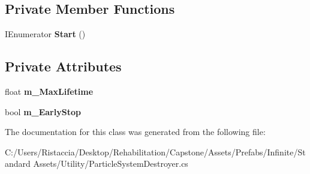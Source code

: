 \subsection*{Private Member Functions}
\begin{DoxyCompactItemize}
\item 
\mbox{\label{class_unity_standard_assets_1_1_utility_1_1_particle_system_destroyer_adc594f53ba658b1d640de36d38952700}} 
I\+Enumerator {\bfseries Start} ()
\end{DoxyCompactItemize}
\subsection*{Private Attributes}
\begin{DoxyCompactItemize}
\item 
\mbox{\label{class_unity_standard_assets_1_1_utility_1_1_particle_system_destroyer_ae1101d42ec76be117b88b5b94642381e}} 
float {\bfseries m\+\_\+\+Max\+Lifetime}
\item 
\mbox{\label{class_unity_standard_assets_1_1_utility_1_1_particle_system_destroyer_afeb180fa70ad60cf7eb9c0993eb211c5}} 
bool {\bfseries m\+\_\+\+Early\+Stop}
\end{DoxyCompactItemize}


The documentation for this class was generated from the following file\+:\begin{DoxyCompactItemize}
\item 
C\+:/\+Users/\+Ristaccia/\+Desktop/\+Rehabilitation/\+Capstone/\+Assets/\+Prefabs/\+Infinite/\+Standard Assets/\+Utility/Particle\+System\+Destroyer.\+cs\end{DoxyCompactItemize}
